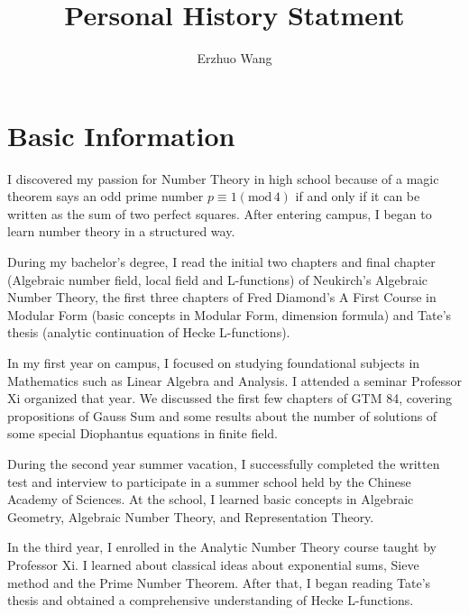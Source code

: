 \documentclass[12pt]{article}
\title{Personal History Statment}
\author{Erzhuo Wang}
\date{}
\renewcommand{\mod}[1]{(\text{mod}\,#1)}
\theoremstyle{definition}
\begin{document}
\maketitle 
\section{Basic Information}
I discovered my passion for Number Theory in high school because of a magic theorem says an odd prime number 
$p \equiv 1\mod{4}$ if and only if it can be written as the sum of two perfect squares. 
After entering campus, I began to learn number theory in a structured way.

During my bachelor's degree,
I read the initial two chapters and final chapter (Algebraic number field, local field and L-functions) of Neukirch's Algebraic Number Theory, 
the first three chapters of Fred Diamond's A First Course in Modular Form (basic concepts in Modular Form, dimension formula)
and Tate's thesis (analytic continuation of Hecke L-functions).  

In my first year on campus, I focused on studying foundational subjects in Mathematics such as Linear Algebra and Analysis.
I attended a seminar Professor Xi organized that year. 
We discussed the first few chapters of GTM 84, covering propositions of Gauss Sum and some results about the number of 
solutions of some special
Diophantus equations in finite field. 

During the second year summer vacation, 
I successfully completed the written test and interview to participate in a summer school held by the Chinese Academy of Sciences. 
At the school, I learned basic concepts in Algebraic Geometry, Algebraic Number Theory, and Representation Theory. 

In the third year, I enrolled in the Analytic Number Theory course taught by Professor Xi. 
I learned about classical ideas about exponential sums, Sieve method and the Prime Number Theorem. 
After that, I began reading Tate's thesis and obtained a comprehensive understanding of Hecke L-functions. 
\end{document}
